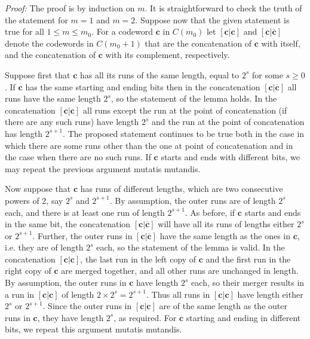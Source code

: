 \noindent \textit{Proof:} The proof is by induction on $m$. It is
straightforward to check the truth of the statement for $m=1$ and
$m=2$. Suppose now that the given statement is true for all $1 \le
m \le m_0$. For a codeword $\mathbf{c}$ in $C(m_0)$ let
$[\mathbf{c} | \mathbf{c}]$ and $[\mathbf{c} |
\mathbf{\overline{c}}]$ denote the codewords in $C(m_0+1)$ that
are the concatenation of $\mathbf{c}$ with itself, and the
concatenation of $\mathbf{c}$ with its complement, respectively.

Suppose first that $\mathbf{c}$ has all its runs of the same
length, equal to $2^s$ for some $s \ge 0$. If $\mathbf{c}$ has the
same starting and ending bits then in the concatenation
$[\mathbf{c} | \mathbf{\overline{c}}]$ all runs have the same
length $2^s$, so the statement of the lemma holds. In the
concatenation $[\mathbf{c} | \mathbf{c}]$ all runs except the run
at the point of concatenation (if there are any such runs) have
length $2^s$ and the run at the point of concatenation has length
$2^{s+1}$. The proposed statement continues to be true both in the
case in which there are some runs other than the one at point of
concatenation and in the case when there are no such runs. If
$\mathbf{c}$ starts and ends with different bits, we may repeat
the previous argument mutatis mutandis.

Now suppose that $\mathbf{c}$ has runs of different lengths, which
are two consecutive powers of 2, say $2^s$ and $2^{s+1}$. By
assumption, the outer runs are of length $2^s$ each, and there is
at least one run of length $2^{s+1}$. As before, if $\mathbf{c}$
starts and ends in the same bit, the concatenation $[\mathbf{c} |
\mathbf{\overline{c}}]$ will have all its runs of lengths either
$2^s$ or $2^{s+1}$. Further, the outer runs in $[\mathbf{c} |
\mathbf{\overline{c}}]$ have the same length as the ones in
$\mathbf{c}$, i.e. they are of length $2^s$ each, so the statement
of the lemma is valid. In the concatenation $[\mathbf{c}
|\mathbf{c}]$, the last run in the left copy of $\mathbf{c}$ and
the first run in the right copy of $\mathbf{c}$ are merged
together, and all other runs are unchanged in length. By
assumption, the outer runs in $\mathbf{c}$ have length $2^s$ each,
so their merger results in a run in $[\mathbf{c} | \mathbf{c}]$ of
length $2 \times 2^s=2^{s+1}$. Thus all runs in $[\mathbf{c} |
\mathbf{c}]$ have length either $2^s$ or $2^{s+1}$. Since the
outer runs in $[\mathbf{c} |\mathbf{c}]$ are of the same length as
the outer runs in $\mathbf{c}$, they have length $2^s$, as
required. For $\mathbf{c}$ starting and ending in different bits,
we repeat this argument mutatis mutandis.

